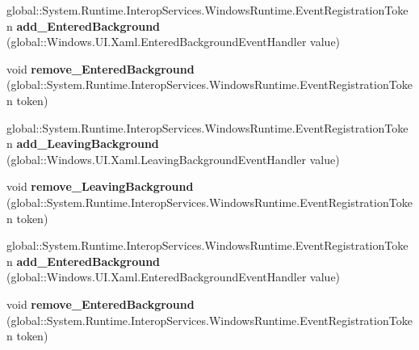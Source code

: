 \begin{DoxyCompactItemize}
global\+::\+System.\+Runtime.\+Interop\+Services.\+Windows\+Runtime.\+Event\+Registration\+Token {\bfseries add\+\_\+\+Entered\+Background} (global\+::\+Windows.\+U\+I.\+Xaml.\+Entered\+Background\+Event\+Handler value)
\item 
\mbox{\label{interface_windows_1_1_u_i_1_1_xaml_1_1_i_application2_a7c5c73853965e2fd025af371c00a6c28}} 
void {\bfseries remove\+\_\+\+Entered\+Background} (global\+::\+System.\+Runtime.\+Interop\+Services.\+Windows\+Runtime.\+Event\+Registration\+Token token)
\item 
\mbox{\label{interface_windows_1_1_u_i_1_1_xaml_1_1_i_application2_ae4e829ae4af3431cd39dbff079622f52}} 
global\+::\+System.\+Runtime.\+Interop\+Services.\+Windows\+Runtime.\+Event\+Registration\+Token {\bfseries add\+\_\+\+Leaving\+Background} (global\+::\+Windows.\+U\+I.\+Xaml.\+Leaving\+Background\+Event\+Handler value)
\item 
\mbox{\label{interface_windows_1_1_u_i_1_1_xaml_1_1_i_application2_a884312cad0a35622df0fc362403e4798}} 
void {\bfseries remove\+\_\+\+Leaving\+Background} (global\+::\+System.\+Runtime.\+Interop\+Services.\+Windows\+Runtime.\+Event\+Registration\+Token token)
\item 
\mbox{\label{interface_windows_1_1_u_i_1_1_xaml_1_1_i_application2_a0f800d5d5f7d3aef7f361e86183cd64b}} 
global\+::\+System.\+Runtime.\+Interop\+Services.\+Windows\+Runtime.\+Event\+Registration\+Token {\bfseries add\+\_\+\+Entered\+Background} (global\+::\+Windows.\+U\+I.\+Xaml.\+Entered\+Background\+Event\+Handler value)
\item 
\mbox{\label{interface_windows_1_1_u_i_1_1_xaml_1_1_i_application2_a7c5c73853965e2fd025af371c00a6c28}} 
void {\bfseries remove\+\_\+\+Entered\+Background} (global\+::\+System.\+Runtime.\+Interop\+Services.\+Windows\+Runtime.\+Event\+Registration\+Token token)
\item 
\mbox{\label{interface_windows_1_1_u_i_1_1_xaml_1_1_i_application2_ae4e829ae4af3431cd39dbff079622f52}} 

\end{DoxyCompactItemize}

